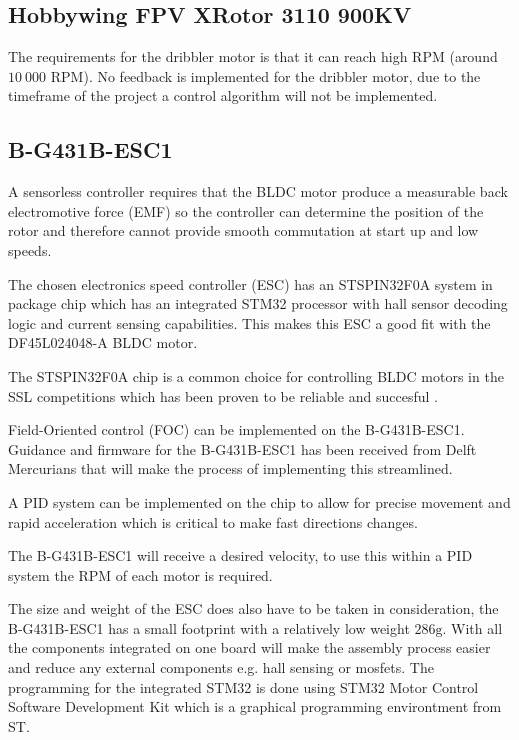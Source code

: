 \documentclass[a4paper,8pt]{article}
\begin{document}
\subsection{Hobbywing FPV XRotor 3110 900KV}

The requirements for the dribbler motor is that it can reach high RPM
(around $10\:000\text{ RPM}$). No feedback is implemented for the
dribbler motor, due to the timeframe of the project a control algorithm will not be implemented.

\subsection{B-G431B-ESC1}

A sensorless controller requires that the BLDC motor produce a
measurable back electromotive force (EMF) so the controller can
determine the position of the rotor and therefore cannot provide
smooth commutation at start up and low speeds.
\cite{roweInstrumentationControlHigh2012}

The chosen electronics speed controller (ESC) has an STSPIN32F0A
system in package chip which has an integrated STM32 processor with
hall sensor decoding logic and current sensing capabilities. This
makes this ESC a good fit with the DF45L024048-A BLDC motor.

The STSPIN32F0A chip is a common choice for controlling BLDC motors in
the SSL competitions which has been proven to be reliable and
succesful
\cite{ryllExtendedTeamDescription}\cite{abousaleh2024TeamDescription}.

Field-Oriented control (FOC) can be implemented on the B-G431B-ESC1. Guidance and firmware for the B-G431B-ESC1 has been received from Delft Mercurians that will make the process of implementing this streamlined.

A PID system can be implemented on the chip to allow for precise
movement and rapid acceleration which is critical to make fast
directions changes.

The B-G431B-ESC1 will receive a desired velocity, to use this within
a PID system the RPM of each motor is required.

The size and weight of the ESC does also have to be taken in
consideration, the B-G431B-ESC1 has a small footprint with a
relatively low weight $286\text{g}$. With all the components
integrated on one board will make the assembly process easier and
reduce any external components e.g. hall sensing or mosfets. The
programming for the integrated STM32 is done using STM32 Motor Control
Software Development Kit which is a graphical programming environtment
from ST.
\end{document}
